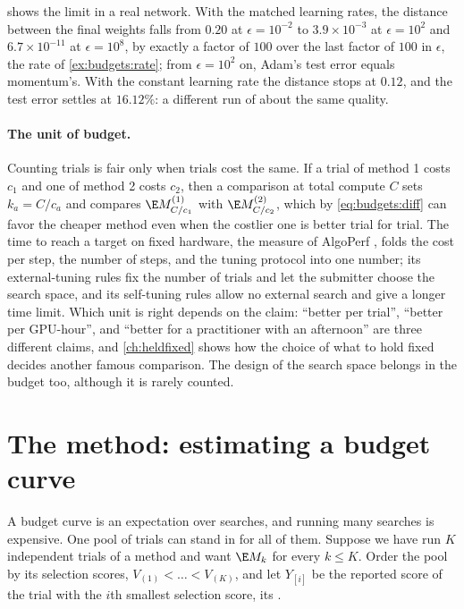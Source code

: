 \begin{refsection}
 shows the limit in a real network. With the matched learning rates, the distance between the final weights falls from $0.20$ at $\epsilon=10^{-2}$ to $3.9\times10^{-3}$ at $\epsilon=10^2$ and $6.7\times10^{-11}$ at $\epsilon=10^8$, by exactly a factor of $100$ over the last factor of $100$ in $\epsilon$, the rate of \cref{ex:budgets:rate}; from $\epsilon=10^2$ on, Adam's test error equals momentum's. With the constant learning rate the distance stops at $0.12$, and the test error settles at $16.12\%$: a different run of about the same quality.

\paragraph{The unit of budget.} Counting trials is fair only when trials cost the same. If a trial of method 1 costs $c_1$ and one of method 2 costs $c_2$, then a comparison at total compute $C$ sets $k_a=C/c_a$ and compares $\E M_{C/c_1}^{(1)}$ with $\E M_{C/c_2}^{(2)}$, which by \eqref{eq:budgets:diff} can favor the cheaper method even when the costlier one is better trial for trial. The time to reach a target on fixed hardware, the measure of AlgoPerf \parencite{DahlEtAl2023}, folds the cost per step, the number of steps, and the tuning protocol into one number; its external-tuning rules fix the number of trials and let the submitter choose the search space, and its self-tuning rules allow no external search and give a longer time limit. Which unit is right depends on the claim: \enquote{better per trial}, \enquote{better per GPU-hour}, and \enquote{better for a practitioner with an afternoon} are three different claims, and \cref{ch:heldfixed} shows how the choice of what to hold fixed decides another famous comparison. The design of the search space belongs in the budget too, although it is rarely counted.

\section{The method: estimating a budget curve}\label{sec:budgets:estimating}

A budget curve is an expectation over searches, and running many searches is expensive. One pool of trials can stand in for all of them. Suppose we have run $K$ independent trials of a method and want $\E M_k$ for every $k\le K$. Order the pool by its selection scores, $V_{(1)}<\dots<V_{(K)}$, and let $Y_{[i]}$ be the reported score of the trial with the $i$th smallest selection score, its .


\end{refsection}
